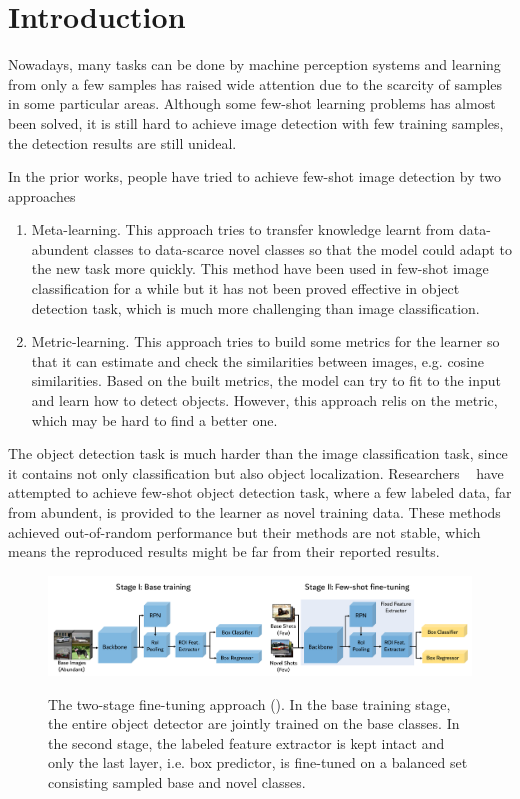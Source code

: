 \section{Introduction}
Nowadays, many tasks can be done by machine perception systems and learning from only a few samples has raised wide attention due to the scarcity of samples in some particular areas. Although some few-shot learning problems has almost been solved, it is still hard to achieve image detection with few training samples, the detection results are still unideal.

In the prior works, people have tried to achieve few-shot image detection by two approaches
\begin{enumerate}
    \item Meta-learning. This approach tries to transfer knowledge learnt from data-abundent classes to data-scarce novel classes so that the model could adapt to the new task more quickly. This method have been used in few-shot image classification for a while but it has not been proved effective in object detection task, which is much more challenging than image classification.
    \item Metric-learning. This approach tries to build some metrics for the learner so that it can estimate and check the similarities between images, e.g. cosine similarities. Based on the built metrics, the model can try to fit to the input and learn how to detect objects. However, this approach relis on the metric, which may be hard to find a better one.
\end{enumerate}

The object detection task is much harder than the image classification task, since it contains not only classification but also object localization. Researchers ~\cite{kang2019few,yan2019meta} have attempted to achieve few-shot object detection task, where a few labeled data, far from abundent, is provided to the learner as novel training data. These methods achieved out-of-random performance but their methods are not stable, which means the reproduced results might be far from their reported results.

\begin{figure}[ht]
    \centering
    \includegraphics[width=\linewidth]{figs/TFA_fig1.pdf}
    \label{fig:tfa_arch}
    \vspace{-0.8cm}
    \caption{The two-stage fine-tuning approach (\model). In the base training stage, the entire object detector are jointly trained on the base classes. In the second stage, the labeled feature extractor is kept intact and only the last layer, i.e. box predictor, is fine-tuned on a balanced set consisting sampled base and novel classes.}
\end{figure}

